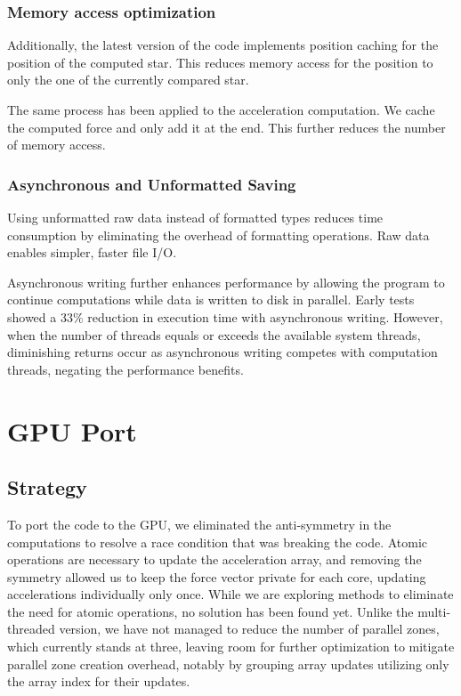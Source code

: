 \documentclass[english,11pt]{article}
\begin{document}
\subsubsection{Memory access optimization}
Additionally, the latest version of the code implements position caching for the position of the computed star. This reduces memory access for the position to only the one of the currently compared star.

The same process has been applied to the acceleration computation. We cache the computed force and only add it at the end. This further reduces the number of memory access.



\subsubsection{Asynchronous and Unformatted Saving}
Using unformatted raw data instead of formatted types reduces time consumption by eliminating the overhead of formatting operations. Raw data enables simpler, faster file I/O. 

Asynchronous writing further enhances performance by allowing the program to continue computations while data is written to disk in parallel. Early tests showed a 33\% reduction in execution time with asynchronous writing. However, when the number of threads equals or exceeds the available system threads, diminishing returns occur as asynchronous writing competes with computation threads, negating the performance benefits.




\section{GPU Port}

\subsection{Strategy}

To port the code to the GPU, we eliminated the anti-symmetry in the computations to resolve a race condition that was breaking the code. Atomic operations are necessary to update the acceleration array, and removing the symmetry allowed us to keep the force vector private for each core, updating accelerations individually only once. While we are exploring methods to eliminate the need for atomic operations, no solution has been found yet. Unlike the multi-threaded version, we have not managed to reduce the number of parallel zones, which currently stands at three, leaving room for further optimization to mitigate parallel zone creation overhead, notably by grouping array updates utilizing only the array index for their updates.
\end{document}
